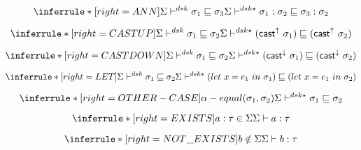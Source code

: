 \[
\inferrule*[right=ANN]
{
\Sigma \polymorphic  \sigma_1 \sqsubseteq \sigma_3}
{\Sigma \polymorphicstar \sigma_1:\sigma_2 \sqsubseteq \sigma_3:\sigma_2}
\]

\[
\inferrule*[right=CASTUP]
{
\Sigma \polymorphic  \sigma_1 \sqsubseteq \sigma_2}
{\Sigma \polymorphicstar  (\mathsf{cast}^\uparrow\ \sigma_1) \sqsubseteq  (\mathsf{cast}^\uparrow\ \sigma_2)  }
\]


\[
\inferrule*[right=CASTDOWN]
{
\Sigma \polymorphic  \sigma_1 \sqsubseteq \sigma_2}
{\Sigma \polymorphicstar  (\mathsf{cast}^\downarrow\ \sigma_1) \sqsubseteq  (\mathsf{cast}^\downarrow\ \sigma_2)  }
\]

\[
\inferrule*[right=LET]
{
\Sigma \polymorphic  \sigma_1 \sqsubseteq \sigma_2}
{\Sigma \polymorphicstar  (let\ x = e_1\ in\ \sigma_1) \sqsubseteq  (let\ x = e_1\ in\ \sigma_2) }
\]

\[
\inferrule*[right=OTHER-CASE]
{  \alpha-equal(\sigma_1, \sigma_2)  }
{ \Sigma \polymorphicstar \sigma_1 \sqsubseteq \sigma_2}
\]


\[
\inferrule*[right=EXISTS]
{ a:\tau \in \Sigma}
{ \Sigma \vdash a:\tau}
\]

\[
\inferrule*[right=NOT\_EXISTS]
{ b \notin \Sigma}
{ \Sigma \vdash b:\tau}
\]
